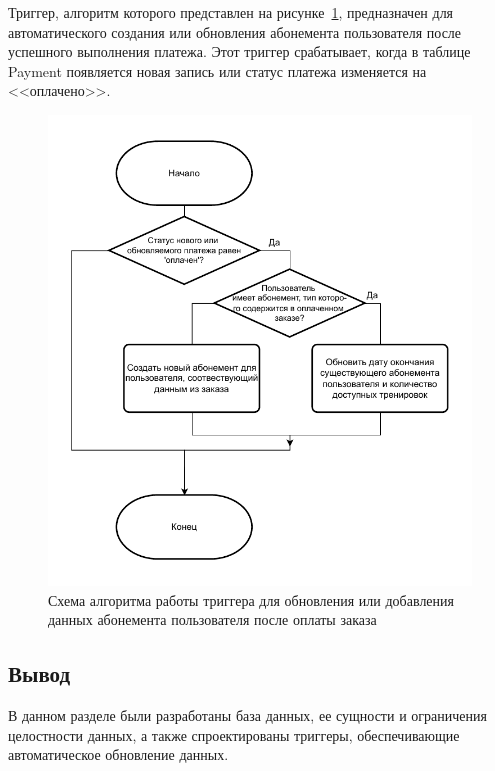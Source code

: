 Триггер, алгоритм которого представлен на рисунке~\ref{fig:tg-pay}, предназначен для автоматического создания или обновления абонемента пользователя после успешного выполнения платежа. Этот триггер срабатывает, когда в таблице Payment появляется новая запись или статус платежа изменяется на <<оплачено>>.
\newpage
\begin{figure}[ht!]
	\begin{center}
		\includegraphics[scale=1]{./diag/trg-ins-upd-membership.pdf}
	\end{center}
	\caption{Схема алгоритма работы триггера для обновления или добавления данных абонемента пользователя после оплаты заказа}
	\label{fig:tg-pay}
\end{figure}

\subsection*{Вывод}

В данном разделе были разработаны база данных, ее сущности и ограничения целостности данных, а также спроектированы триггеры, обеспечивающие автоматическое обновление данных.

